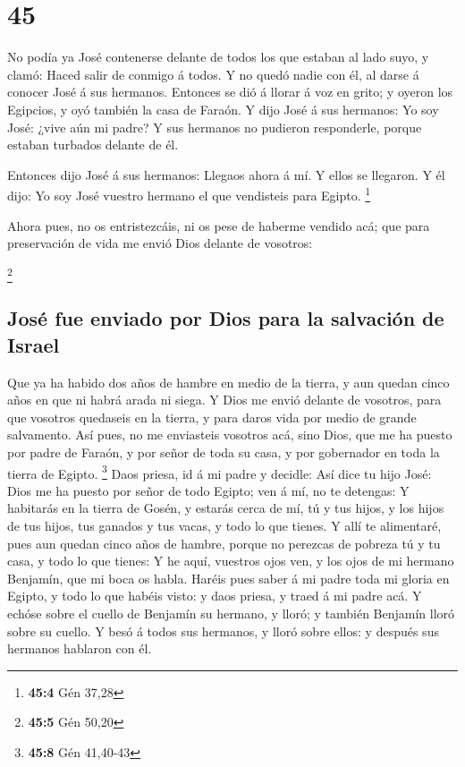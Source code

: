 \hypertarget{section-44}{%
\section{45}\label{section-44}}

 No podía ya José contenerse delante de todos los que
estaban al lado suyo, y clamó: Haced salir de conmigo á todos. Y no
quedó nadie con él, al darse á conocer José á sus hermanos. 
Entonces se dió á llorar á voz en grito; y oyeron los Egipcios, y oyó
también la casa de Faraón.  Y dijo José á sus hermanos: Yo
soy José: ¿vive aún mi padre? Y sus hermanos no pudieron responderle,
porque estaban turbados delante de él.

 Entonces dijo José á sus hermanos: Llegaos ahora á mí. Y
ellos se llegaron. Y él dijo: Yo soy José vuestro hermano el que
vendisteis para Egipto. \footnote{\textbf{45:4} Gén 37,28}

 Ahora pues, no os entristezcáis, ni os pese de haberme
vendido acá; que para preservación de vida me envió Dios delante de
vosotros:

\footnote{\textbf{45:5} Gén 50,20}

\hypertarget{josuxe9-fue-enviado-por-dios-para-la-salvaciuxf3n-de-israel}{%
\subsection{José fue enviado por Dios para la salvación de
Israel}\label{josuxe9-fue-enviado-por-dios-para-la-salvaciuxf3n-de-israel}}

 Que ya ha habido dos años de hambre en medio de la tierra,
y aun quedan cinco años en que ni habrá arada ni siega.  Y
Dios me envió delante de vosotros, para que vosotros quedaseis en la
tierra, y para daros vida por medio de grande salvamento. 
Así pues, no me enviasteis vosotros acá, sino Dios, que me ha puesto por
padre de Faraón, y por señor de toda su casa, y por gobernador en toda
la tierra de Egipto. \footnote{\textbf{45:8} Gén 41,40-43} 
Daos priesa, id á mi padre y decidle: Así dice tu hijo José: Dios me ha
puesto por señor de todo Egipto; ven á mí, no te detengas: 
Y habitarás en la tierra de Gosén, y estarás cerca de mí, tú y tus
hijos, y los hijos de tus hijos, tus ganados y tus vacas, y todo lo que
tienes.  Y allí te alimentaré, pues aun quedan cinco años
de hambre, porque no perezcas de pobreza tú y tu casa, y todo lo que
tienes:  Y he aquí, vuestros ojos ven, y los ojos de mi
hermano Benjamín, que mi boca os habla.  Haréis pues saber
á mi padre toda mi gloria en Egipto, y todo lo que habéis visto: y daos
priesa, y traed á mi padre acá.  Y echóse sobre el cuello
de Benjamín su hermano, y lloró; y también Benjamín lloró sobre su
cuello.  Y besó á todos sus hermanos, y lloró sobre ellos:
y después sus hermanos hablaron con él.

